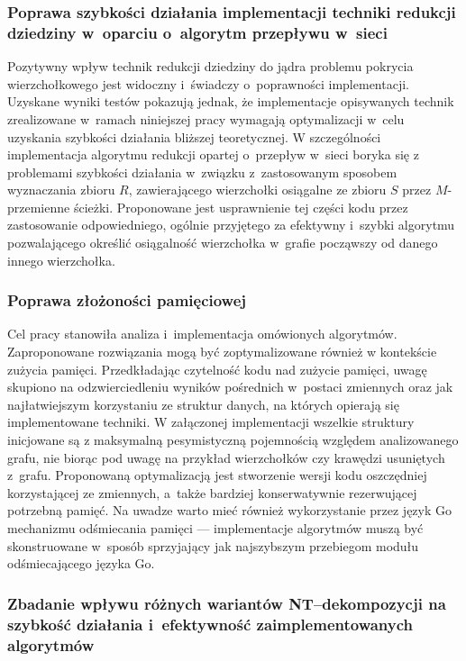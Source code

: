   \subsubsection{\textbf{Poprawa szybkości działania implementacji techniki redukcji dziedziny w~oparciu o~algorytm przepływu w~sieci}}

  Pozytywny wpływ technik redukcji dziedziny do jądra problemu pokrycia wierzchołkowego jest widoczny i~świadczy o~poprawności implementacji.
  Uzyskane wyniki testów pokazują jednak, że implementacje opisywanych technik zrealizowane w~ramach niniejszej pracy wymagają optymalizacji w~celu uzyskania szybkości działania bliższej teoretycznej.
  W szczególności implementacja algorytmu redukcji opartej o~przepływ w~sieci boryka się z problemami szybkości działania w~związku z~zastosowanym sposobem wyznaczania zbioru $R$, zawierającego wierzchołki osiągalne ze zbioru $S$ przez $M$-przemienne ścieżki.
  Proponowane jest usprawnienie tej części kodu przez zastosowanie odpowiedniego, ogólnie przyjętego za efektywny i~szybki algorytmu pozwalającego określić osiągalność wierzchołka w~grafie począwszy od danego innego wierzchołka.

  \subsubsection{\textbf{Poprawa złożoności pamięciowej}}

  Cel pracy stanowiła analiza i~implementacja omówionych algorytmów.
  Zaproponowane rozwiązania mogą być zoptymalizowane również w kontekście zużycia pamięci.
  Przedkładając czytelność kodu nad zużycie pamięci, uwagę skupiono na odzwierciedleniu wyników pośrednich w~postaci zmiennych oraz jak najłatwiejszym korzystaniu ze struktur danych, na których opierają się implementowane techniki.
  W załączonej implementacji wszelkie struktury inicjowane są z maksymalną pesymistyczną pojemnością względem analizowanego grafu, nie biorąc pod uwagę na przykład wierzchołków czy krawędzi usuniętych z~grafu.
  Proponowaną optymalizacją jest stworzenie wersji kodu oszczędniej korzystającej ze zmiennych, a~także bardziej konserwatywnie rezerwującej potrzebną pamięć.
  Na uwadze warto mieć również wykorzystanie przez język Go mechanizmu odśmiecania pamięci --- implementacje algorytmów muszą być skonstruowane w~sposób sprzyjający jak najszybszym przebiegom modułu odśmiecającego języka Go.

  \subsubsection{\textbf{Zbadanie wpływu różnych wariantów NT--dekompozycji na szybkość działania i~efektywność zaimplementowanych algorytmów}}

